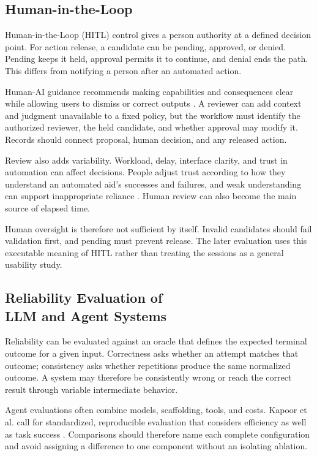 \subsection{Human-in-the-Loop}\label{subsec:theory-hitl}

Human-in-the-Loop (HITL) control gives a person authority at a defined decision
point. For action release, a candidate can be pending, approved, or denied.
Pending keeps it held, approval permits it to continue, and denial ends the path.
This differs from notifying a person after an automated action.

Human-AI guidance recommends making capabilities and consequences clear while
allowing users to dismiss or correct outputs \cite{amershi2019guidelines}. A
reviewer can add context and judgment unavailable to a fixed policy, but the
workflow must identify the authorized reviewer, the held candidate, and whether
approval may modify it. Records should connect proposal, human decision, and any
released action.

Review also adds variability. Workload, delay, interface clarity, and trust in
automation can affect decisions. People adjust trust according to how they
understand an automated aid's successes and failures, and weak understanding can
support inappropriate reliance \cite{dzindolet2003trust}. Human review can also
become the main source of elapsed time.

Human oversight is therefore not sufficient by itself. Invalid candidates should
fail validation first, and pending must prevent release. The later evaluation
uses this executable meaning of HITL rather than treating the sessions as a
general usability study.

\subsection[Reliability Evaluation of LLM and Agent Systems]{Reliability Evaluation of\\LLM and Agent Systems}\label{subsec:theory-reliability}

Reliability can be evaluated against an oracle that defines the expected terminal
outcome for a given input. Correctness asks whether an attempt matches that
outcome; consistency asks whether repetitions produce the same normalized
outcome. A system may therefore be consistently wrong or reach the correct result
through variable intermediate behavior.

Agent evaluations often combine models, scaffolding, tools, and costs. Kapoor et
al. call for standardized, reproducible evaluation that considers efficiency as
well as task success \cite{kapoor2025agentsmatter}. Comparisons should therefore
name each complete configuration and avoid assigning a difference to one
component without an isolating ablation.

